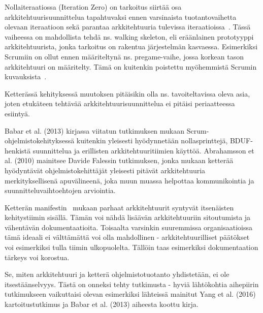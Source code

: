 Nollaiteraatiossa (Iteration Zero) on tarkoitus siirtää osa arkkitehtuurisuunnittelua tapahtuvaksi ennen varsinaista tuotantovaihetta olevaan iteraatioon sekä parantaa arkkitehtuuria tulevissa iteraatioissa~\citep{babar2013agile}. Tässä vaiheessa on mahdollista tehdä ns. walking skeleton, eli eräänlainen prototyyppi arkkitehtuurista, jonka tarkoitus on rakentua järjestelmän kasvaessa. Esimerkiksi Scrumiin on ollut ennen määriteltynä ns. pregame-vaihe, jossa korkean tason arkkitehtuuri on määritelty. Tämä on kuitenkin poistettu myöhemmistä Scrumin kuvauksista~\citep{babar2013agile}. 

Ketterässä kehityksessä muutoksen pitäisikin olla ns. tavoiteltavissa oleva asia, joten etukäteen tehtävää arkkitehtuurisuunnittelua ei pitäisi periaatteessa esiintyä. 

Babar et al. (2013) kirjassa viitatun tutkimuksen mukaan Scrum-ohjelmistokehityksessä kuitenkin yleisesti hyödynnetään nollasprinttejä, BDUF-henkistä suunnittelua ja erillisten arkkitehtuuritiimien käyttöä. Abrahamsson et al. (2010) mainitsee Davide Falessin tutkimuksen, jonka mukaan ketterää hyödyntävät ohjelmistokehittäjät yleisesti pitävät arkkitehtuuria merkityksellisenä apuvälineenä, joka muun muassa helpottaa kommunikointia ja suunnitteluvaihtoehtojen arviointia.

Ketterän manifestin~\citep{fowler2001agile} mukaan parhaat arkkitehtuurit syntyvät itsenäisten kehitystiimin sisällä. Tämän voi nähdä lisäävän arkkitehtuuriin sitoutumista ja vähentävän dokumentaatioita. Toisaalta varsinkin suuremmissa organisaatioissa tämä ideaali ei välttämättä voi olla mahdollinen - arkkitehtuurilliset päätökset voi esimerkiksi tulla tiimin ulkopuolelta. Tällöin taas esimerkiksi dokumentaation tärkeys voi korostua.

Se, miten arkkitehtuuri ja ketterä ohjelmistotuotanto yhdistetään, ei ole itsestäänselvyys. Tästä on onneksi tehty tutkimusta - hyviä lähtökohtia aihepiirin tutkimukseen vaikuttaisi olevan esimerkiksi lähteissä mainitut Yang et al. (2016) kartoitustutkimus ja Babar et al. (2013) aiheesta koottu kirja.


\thispagestyle{empty}
